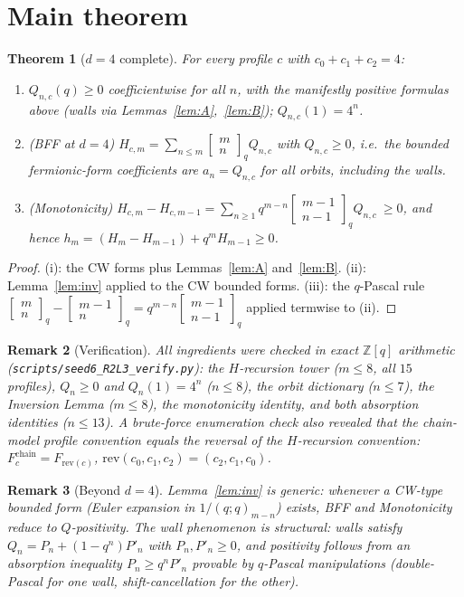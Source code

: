 \documentclass[11pt]{article}
\newtheorem{theorem}{Theorem}
\newtheorem{remark}[theorem]{Remark}
\newcommand{\qbin}[2]{\begin{bmatrix}#1\\#2\end{bmatrix}_q}
\newcommand{\poch}[1]{(q;q)_{#1}}
\begin{document}
\section*{Main theorem}

\begin{theorem}[$d=4$ complete]
For every profile $c$ with $c_0+c_1+c_2=4$:
\begin{enumerate}
\item[(i)] $Q_{n,c}(q)\ge0$ coefficientwise for all $n$, with the manifestly positive
formulas above (walls via Lemmas~\ref{lem:A},~\ref{lem:B}); $Q_{n,c}(1)=4^n$.
\item[(ii)] (BFF at $d=4$) $H_{c,m}=\sum_{n\le m}\qbin{m}{n}Q_{n,c}$ with $Q_{n,c}\ge0$,
i.e.\ the bounded fermionic-form coefficients are $a_n=Q_{n,c}$ for \emph{all} orbits,
including the walls.
\item[(iii)] (Monotonicity) $H_{c,m}-H_{c,m-1}
=\sum_{n\ge1}q^{m-n}\qbin{m-1}{n-1}Q_{n,c}\ \ge0$, and hence
$h_m=(H_m-H_{m-1})+q^mH_{m-1}\ge0$.
\end{enumerate}
\end{theorem}

\begin{proof}
(i): the CW forms plus Lemmas~\ref{lem:A} and~\ref{lem:B}.
(ii): Lemma~\ref{lem:inv} applied to the CW bounded forms.
(iii): the $q$-Pascal rule $\qbin{m}{n}-\qbin{m-1}{n}=q^{m-n}\qbin{m-1}{n-1}$ applied
termwise to (ii).
\end{proof}

\begin{remark}[Verification]
All ingredients were checked in exact $\mathbb{Z}[q]$ arithmetic
(\texttt{scripts/seed6\_R2L3\_verify.py}): the $H$-recursion tower ($m\le8$, all $15$
profiles), $Q_n\ge0$ and $Q_n(1)=4^n$ ($n\le8$), the orbit dictionary ($n\le7$), the
Inversion Lemma ($m\le8$), the monotonicity identity, and both absorption identities
($n\le13$). A brute-force enumeration check also revealed that the chain-model profile
convention equals the \emph{reversal} of the $H$-recursion convention:
$F^{\mathrm{chain}}_{c}=F_{\mathrm{rev}(c)}$, $\mathrm{rev}(c_0,c_1,c_2)=(c_2,c_1,c_0)$.
\end{remark}

\begin{remark}[Beyond $d=4$]
Lemma~\ref{lem:inv} is generic: whenever a CW-type bounded form (Euler expansion in
$1/\poch{m-n}$) exists, BFF and Monotonicity reduce to $Q$-positivity. The wall
phenomenon is structural: walls satisfy $Q_n=P_n+(1-q^n)P'_n$ with $P_n,P'_n\ge0$, and
positivity follows from an absorption inequality $P_n\ge q^nP'_n$ provable by $q$-Pascal
manipulations (double-Pascal for one wall, shift-cancellation for the other).
\end{remark}
\end{document}
